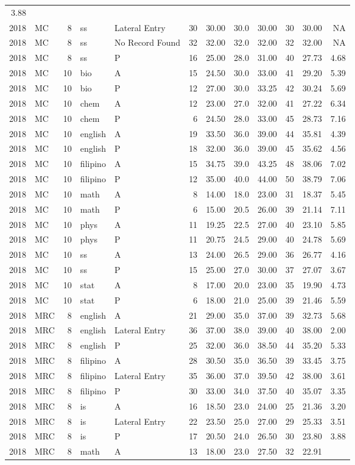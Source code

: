 \documentclass[]{article}
\begin{document}
\begin{longtable}[]{@{}rlrllrrrrrrr@{}}
3.88\tabularnewline
2018 & MC & 8 & ss & Lateral Entry & 30 & 30.00 & 30.0 & 30.00 & 30 &
30.00 & NA\tabularnewline
2018 & MC & 8 & ss & No Record Found & 32 & 32.00 & 32.0 & 32.00 & 32 &
32.00 & NA\tabularnewline
2018 & MC & 8 & ss & P & 16 & 25.00 & 28.0 & 31.00 & 40 & 27.73 &
4.68\tabularnewline
2018 & MC & 10 & bio & A & 15 & 24.50 & 30.0 & 33.00 & 41 & 29.20 &
5.39\tabularnewline
2018 & MC & 10 & bio & P & 12 & 27.00 & 30.0 & 33.25 & 42 & 30.24 &
5.69\tabularnewline
2018 & MC & 10 & chem & A & 12 & 23.00 & 27.0 & 32.00 & 41 & 27.22 &
6.34\tabularnewline
2018 & MC & 10 & chem & P & 6 & 24.50 & 28.0 & 33.00 & 45 & 28.73 &
7.16\tabularnewline
2018 & MC & 10 & english & A & 19 & 33.50 & 36.0 & 39.00 & 44 & 35.81 &
4.39\tabularnewline
2018 & MC & 10 & english & P & 18 & 32.00 & 36.0 & 39.00 & 45 & 35.62 &
4.56\tabularnewline
2018 & MC & 10 & filipino & A & 15 & 34.75 & 39.0 & 43.25 & 48 & 38.06 &
7.02\tabularnewline
2018 & MC & 10 & filipino & P & 12 & 35.00 & 40.0 & 44.00 & 50 & 38.79 &
7.06\tabularnewline
2018 & MC & 10 & math & A & 8 & 14.00 & 18.0 & 23.00 & 31 & 18.37 &
5.45\tabularnewline
2018 & MC & 10 & math & P & 6 & 15.00 & 20.5 & 26.00 & 39 & 21.14 &
7.11\tabularnewline
2018 & MC & 10 & phys & A & 11 & 19.25 & 22.5 & 27.00 & 40 & 23.10 &
5.85\tabularnewline
2018 & MC & 10 & phys & P & 11 & 20.75 & 24.5 & 29.00 & 40 & 24.78 &
5.69\tabularnewline
2018 & MC & 10 & ss & A & 13 & 24.00 & 26.5 & 29.00 & 36 & 26.77 &
4.16\tabularnewline
2018 & MC & 10 & ss & P & 15 & 25.00 & 27.0 & 30.00 & 37 & 27.07 &
3.67\tabularnewline
2018 & MC & 10 & stat & A & 8 & 17.00 & 20.0 & 23.00 & 35 & 19.90 &
4.73\tabularnewline
2018 & MC & 10 & stat & P & 6 & 18.00 & 21.0 & 25.00 & 39 & 21.46 &
5.59\tabularnewline
2018 & MRC & 8 & english & A & 21 & 29.00 & 35.0 & 37.00 & 39 & 32.73 &
5.68\tabularnewline
2018 & MRC & 8 & english & Lateral Entry & 36 & 37.00 & 38.0 & 39.00 &
40 & 38.00 & 2.00\tabularnewline
2018 & MRC & 8 & english & P & 25 & 32.00 & 36.0 & 38.50 & 44 & 35.20 &
5.33\tabularnewline
2018 & MRC & 8 & filipino & A & 28 & 30.50 & 35.0 & 36.50 & 39 & 33.45 &
3.75\tabularnewline
2018 & MRC & 8 & filipino & Lateral Entry & 35 & 36.00 & 37.0 & 39.50 &
42 & 38.00 & 3.61\tabularnewline
2018 & MRC & 8 & filipino & P & 30 & 33.00 & 34.0 & 37.50 & 40 & 35.07 &
3.35\tabularnewline
2018 & MRC & 8 & is & A & 16 & 18.50 & 23.0 & 24.00 & 25 & 21.36 &
3.20\tabularnewline
2018 & MRC & 8 & is & Lateral Entry & 22 & 23.50 & 25.0 & 27.00 & 29 &
25.33 & 3.51\tabularnewline
2018 & MRC & 8 & is & P & 17 & 20.50 & 24.0 & 26.50 & 30 & 23.80 &
3.88\tabularnewline
2018 & MRC & 8 & math & A & 13 & 18.00 & 23.0 & 27.50 & 32 & 22.91 &

\end{longtable}
\end{document}
